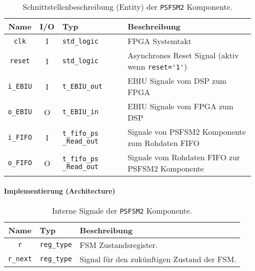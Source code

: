 \begin{table}[htbp]
    \ttabbox
    {
        \caption[PSFSM2 Schnittstelle]{Schnittstellenbeschreibung (Entity) der \lstinline$PSFSM2$ Komponente.}
        \label{TabPSFSM2_Entity}
    }
    {
    \begin{tabular}{c c  p{2cm} p{5.5cm}}
        \toprule
        Name                & I/O	& Typ				                & Beschreibung \\
        \midrule
        \lstinline$clk$	    & I	    & \lstinline$std_logic$	        	& FPGA Systemtakt\\
        \lstinline$reset$	& I	    & \lstinline$std_logic$	        	& Asynchrones Reset Signal (aktiv wenn \lstinline$reset='1'$) \\
        \lstinline$i_EBIU$	& I	    & \lstinline$t_EBIU_out$	    	& EBIU Signale vom DSP zum FPGA\\
        \lstinline$o_EBIU$	& O	    & \lstinline$t_EBIU_in$		        & EBIU Signale vom FPGA zum DSP\\
        \lstinline$i_FIFO$	& I	    & \lstinline$t_fifo_ps _Read_out$	& Signale von PSFSM2 Komponente zum Rohdaten FIFO \\
        \lstinline$o_FIFO$	& O	    & \lstinline$t_fifo_ps _Read_out$	& Signale vom Rohdaten FIFO zur PSFSM2 Komponente \\
        \bottomrule
    \end{tabular}
}
\end{table}


\paragraph{Implementierung (Architecture)}

\begin{table}[htbp]
    \ttabbox
    {
        \caption[Interne Signale der PSFSM2 Architecture]{Interne Signale der \lstinline$PSFSM2$ Komponente.}
        \label{TabPSFSM2_ArchSignals}
    }
    {
    \begin{tabular}{c  p{2cm} p{6cm}}
        \toprule
        Name      		& Typ         & Beschreibung \\
        \midrule
        \lstinline$r$		& \lstinline$reg_type$ & \gls{FSM} Zustandsregister.\\
        \lstinline$r_next$	& \lstinline$reg_type$ & Signal für den zukünftigen Zustand der \gls{FSM}.\\
        \bottomrule
    \end{tabular}
}
\end{table}

